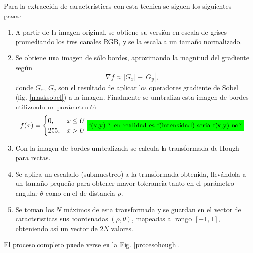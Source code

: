 \documentclass[conference,spanish,a4paper,10pt,oneside,final]{tfmpd}
\begin{document}
Para la extracción de características con esta técnica se siguen los siguientes
pasos:
\begin{enumerate}
\item A partir de la imagen original, se obtiene %
su versión en escala de grises
      promediando los tres canales RGB, y se la escala a un tamaño normalizado.
\item Se obtiene una imagen de sólo bordes, aproximando la magnitud del
      gradiente según
      \begin{equation}
      \label{sob}
      \nabla f \approx |G_x| + |G_y|,
      \end{equation}
      donde $G_x$, $G_y$ son el resultado de aplicar los operadores gradiente
      de Sobel (fig. \ref{masksobel}) a la imagen. 
      Finalmente se umbraliza esta imagen de bordes %
      utilizando un parámetro $U$:
      \begin{equation}
      \label{umbral}
      f(x)=
      \begin{cases}
      0, & x\leq U\\
      255, & x > U
      \end{cases}
            \resalt{f(x,y) ? en realidad es f(intensidad) seria f(x,y) no?}
      \end{equation}

\item Con la imagen de bordes umbralizada se calcula la transformada de
      Hough para rectas.
\item Se aplica un escalado (submuestreo) a la transformada obtenida, llevándola
      a un tamaño
      pequeño %
      para obtener mayor tolerancia tanto en el parámetro angular
      $\theta$ como en el de distancia $\rho$.
\item Se toman los $N$ máximos de esta transformada y se guardan en el vector de
      características %
      sus coordenadas $(\rho,\theta)$, mapeadas al rango
      $[-1,1]$, obteniendo así un vector de $2N$ valores.
\end{enumerate}
El proceso completo puede verse en la Fig. \ref{procesohough}.
\end{document}
